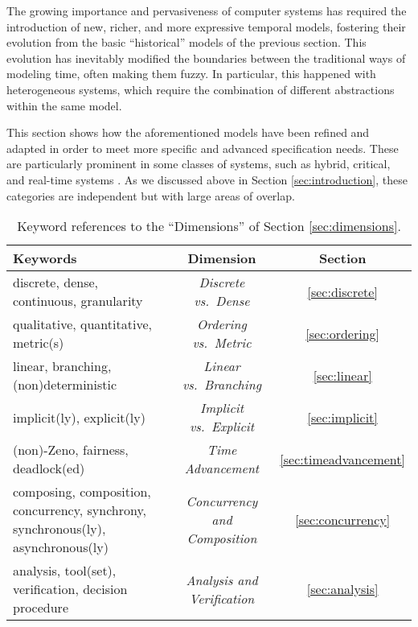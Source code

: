 The growing importance and pervasiveness of computer systems 
has required the introduction of new, richer, and more expressive 
temporal models, fostering their evolution from the basic ``historical'' 
models of the previous section. This evolution has inevitably 
modified the boundaries between the traditional ways of modeling 
time, often making them fuzzy. In particular, this happened with 
heterogeneous systems, which require the combination of different abstractions 
within the same model.

This section shows how the aforementioned models have been refined 
and adapted in order to meet more specific and advanced specification 
needs. These are particularly prominent in some classes of systems, 
such as hybrid, critical, and real-time systems \cite{HM96}. As we 
discussed above in Section \ref{sec:introduction}, these categories are independent 
but with large areas of overlap.


\begin{table}[!ht]
\centering
\begin{scriptsize}
\begin{tabular}{|p{5cm}|c|c|}
\hline 
\textbf{Keywords} & \textbf{Dimension} & \textbf{Section} \\
\hline 
discrete, dense, continuous, granularity & \emph{Discrete vs.~Dense} & \ref{sec:discrete} \\
\hline 
qualitative, quantitative, metric(s) & \emph{Ordering vs.~Metric} & \ref{sec:ordering} \\
\hline 
linear, branching, (non)deterministic & \emph{Linear vs.~Branching} & \ref{sec:linear} \\
\hline 
implicit(ly), explicit(ly) & \emph{Implicit vs.~Explicit} & \ref{sec:implicit} \\
\hline 
(non)-Zeno, fairness, deadlock(ed) & \emph{Time Advancement} & \ref{sec:timeadvancement} \\
\hline 
composing, composition, concurrency, synchrony, synchronous(ly), asynchronous(ly) & \emph{Concurrency and Composition} & \ref{sec:concurrency} \\
\hline 
analysis, tool(set), verification, decision procedure & \emph{Analysis and Verification} & \ref{sec:analysis} \\
\hline 
\end{tabular}
\end{scriptsize}
\caption{Keyword references to the ``Dimensions'' of Section \ref{sec:dimensions}.}
\label{tab:keywords}
\end{table}


